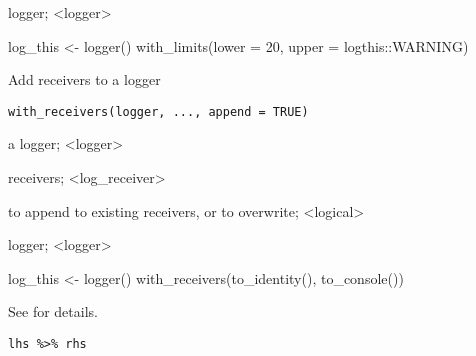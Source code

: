 \documentclass[letterpaper]{book}
\begin{document}
%
\begin{Value}
logger; <logger>
\end{Value}
%
\begin{Examples}
\begin{ExampleCode}
log_this <- logger() %
    with_limits(lower = 20,
                upper = logthis::WARNING)
\end{ExampleCode}
\end{Examples}
%
\begin{Description}
Add receivers to a logger
\end{Description}
%
\begin{Usage}
\begin{verbatim}
with_receivers(logger, ..., append = TRUE)
\end{verbatim}
\end{Usage}
%
\begin{Arguments}
\begin{ldescription}
\item[\code{logger}] a logger; <logger>

\item[\code{...}] receivers; <log\_receiver>

\item[\code{append}] to append to existing receivers, or to overwrite; <logical>
\end{ldescription}
\end{Arguments}
%
\begin{Value}
logger; <logger>
\end{Value}
%
\begin{Examples}
\begin{ExampleCode}

log_this <- logger() 
    with_receivers(to_identity(),
                   to_console())

\end{ExampleCode}
\end{Examples}
%
\begin{Description}
See  for details.
\end{Description}
%
\begin{Usage}
\begin{verbatim}
lhs %>% rhs
\end{verbatim}
\end{Usage}
\printindex{}
\end{document}
